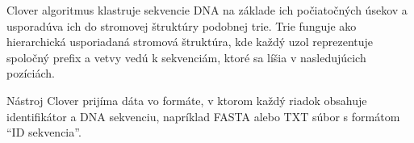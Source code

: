 Clover algoritmus klastruje sekvencie DNA na základe ich počiatočných úsekov a usporadúva ich do stromovej štruktúry podobnej trie.
Trie funguje ako hierarchická usporiadaná stromová štruktúra, kde každý uzol reprezentuje spoločný prefix a vetvy vedú k sekvenciám, ktoré sa líšia v nasledujúcich pozíciách.

Nástroj Clover prijíma dáta vo formáte, v ktorom každý riadok obsahuje identifikátor a DNA sekvenciu, napríklad FASTA alebo TXT súbor s formátom \enquote{ID sekvencia}.
